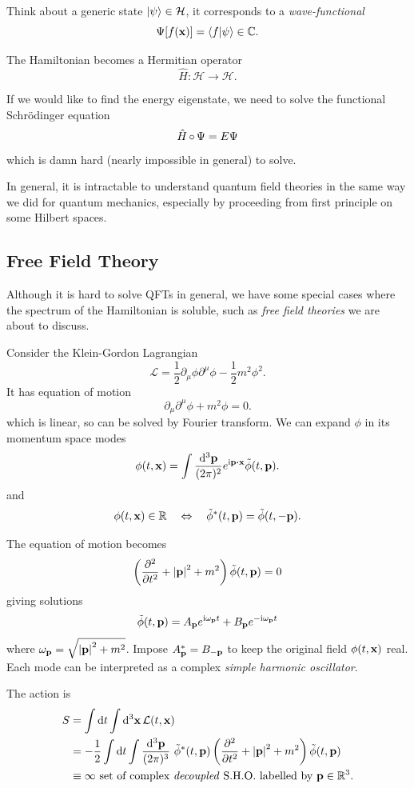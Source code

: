 \documentclass[a4paper,11pt]{article}
\begin{document}
	Think about a generic state $\ket{\psi}\in \mathcal{H}$, it corresponds to a \emph{wave-functional}
	\[
		\Psi[f(\vb x)] = \braket{f}{\psi} \in \mathbb{C}.
	\]
	
	The Hamiltonian becomes a Hermitian operator
	\[
		\hat{{H}}: \mathcal{H}\to \mathcal{H}.
	\]
	
	If we would like to find the energy eigenstate, we need to solve the functional Schr\"odinger equation
	\[
		\hat{{H}} \operatorname{\circ} \Psi = E \Psi
	\]
	which is damn hard (nearly impossible in general) to solve.

	In general, it is intractable to understand quantum field theories in the same way we did for quantum mechanics, especially by proceeding from first principle on some Hilbert spaces.

	\subsection{Free Field Theory} 	
	Although it is hard to solve QFTs in general, we have some special cases where the spectrum of the Hamiltonian is soluble, such as \emph{free field theories} we are about to discuss.

	Consider the Klein-Gordon Lagrangian
	\[
		\mathcal{L} = \frac{1}{2} \partial_\mu \phi \partial^\mu \phi - \frac{1}{2} m^2 \phi^2.
	\]
	It has equation of motion
	\[
		\partial_\mu \partial^\mu \phi + m^2 \phi = 0.
	\]
	which is linear, so can be solved by Fourier transform. We can expand $\phi$ in its momentum space modes
	\[
		\phi(t,\vb x) = \int \frac{\dd[3]{\vb p}}{(2 \pi)^2} e ^{\mathrm{i} \vb p \vdot \vb x} \tilde{\phi}(t,\vb p).
	\]
	and
	\[
		\phi(t,\vb x) \in \mathbb{R} \quad \Leftrightarrow \quad \tilde{\phi}^*(t,\vb p) = \tilde{\phi}(t, -\vb p).
	\]
	
	The equation of motion becomes
	\[
		\left( \pdv[2]{t} + \abs{\vb p}^2 + m^2 \right) \tilde{\phi}(t, \vb p) = 0
	\]
	giving solutions
	\[
		\tilde{\phi}(t,\vb p) = A _{\vb p} e ^{\mathrm{i} \omega _{\vb p} t} + B _{\vb p}e ^{-\mathrm{i} \omega _{\vb p}t}
	\]
	where $\omega _{\vb p} = \sqrt{\abs{\vb p}^2 + m^2}$. Impose $A^* _{\vb p} = B _{-\vb p}$ to keep the original field $\phi (t, \vb x)$ real. Each mode can be interpreted as a complex \emph{simple harmonic oscillator}.

	The action is
	\begin{align*}
		S & = \int \dd{t} \int \dd[3]{\vb x} \mathcal{L}(t,\vb x)\\
		& = -\frac{1}{2} \int \dd{t} \int \frac{\dd[3]{\vb p}}{(2\pi)^3}\ \tilde{\phi}^*(t,\vb p) \left(\pdv[2]{t} + \abs{\vb p}^2 + m^2 \right)\tilde{\phi}(t,\vb p)\\
		& \equiv \infty \text{ set of complex \emph{decoupled} S.H.O.\ labelled by }\vb p \in \mathbb{R}^3. 
	\end{align*}
\end{document}
